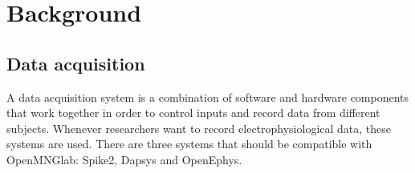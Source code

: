 \chapter{Background}

\section{Data acquisition} 
A data acquisition system is a combination of software and hardware components that work together in order to control inputs and record data from different subjects. Whenever researchers want to record electrophysiological data, these systems are used.
There are three systems that should be compatible with OpenMNGlab: Spike2, Dapsys and OpenEphys.

